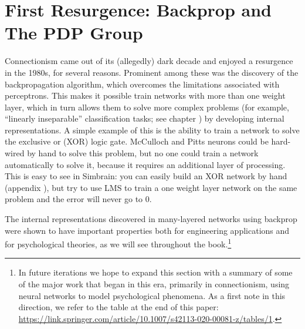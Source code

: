 \section{First Resurgence: Backprop and The PDP Group}\label{first_resurgence}


Connectionism came out of its (allegedly) dark decade and enjoyed a resurgence in the 1980s, for several reasons. Prominent among these was the discovery of the backpropagation algorithm, which overcomes the limitations associated with perceptrons. This makes it possible train networks with more than one weight layer, which in turn allows them to solve more complex problems (for example, ``linearly inseparable'' classification tasks; see chapter ) by developing internal representations. A simple example of this is the ability to train a network to solve the exclusive or (XOR) logic gate. McCulloch and Pitts neurons could be hard-wired by hand to solve this problem, but no one could train a network automatically to solve it, because it requires an additional layer of processing. This is easy to see in Simbrain: you can easily build an XOR network by hand (appendix  ), but try to use LMS to train a one weight layer network on the same problem and the error will never go to 0. 

The internal representations discovered in many-layered networks using backprop were shown to have important properties both for engineering applications and for psychological theories, as we will see throughout the book.\footnote{In future iterations we hope to expand this section with a summary of some of the major work that began in this era, primarily in connectionism, using neural networks to model psychological phenomena. As a first note in this direction, we refer to the table at the end of this paper: \url{https://link.springer.com/article/10.1007/s42113-020-00081-z/tables/1}.}

